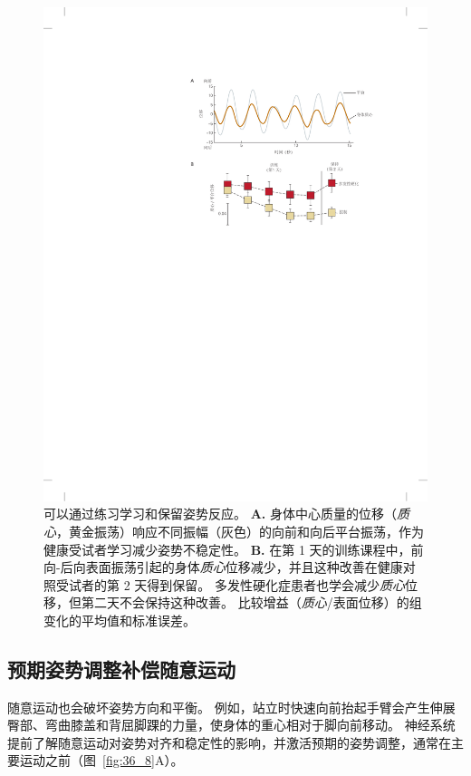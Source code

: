 \begin{figure}[htbp]
	\centering
	\includegraphics[width=0.8\linewidth]{chap36/fig_36_7}
	\caption{可以通过练习学习和保留姿势反应。
		\textbf{A.} 身体中心质量的位移（\textit{质心}，黄金振荡）响应不同振幅（灰色）的向前和向后平台振荡，作为健康受试者学习减少姿势不稳定性。
		\textbf{B.} 在第 1 天的训练课程中，前向-后向表面振荡引起的身体\textit{质心}位移减少，并且这种改善在健康对照受试者的第 2 天得到保留。
		多发性硬化症患者也学会减少\textit{质心}位移，但第二天不会保持这种改善。
		比较增益（\textit{质心}/表面位移）的组变化的平均值和标准误差\cite{gera2016postural}。}
	\label{fig:36_7}
\end{figure}



\subsection{预期姿势调整补偿随意运动}

随意运动也会破坏姿势方向和平衡。
例如，站立时快速向前抬起手臂会产生伸展臀部、弯曲膝盖和背屈脚踝的力量，使身体的重心相对于脚向前移动。
神经系统提前了解随意运动对姿势对齐和稳定性的影响，并激活预期的姿势调整，通常在主要运动之前（图~\ref{fig:36_8}A）。


